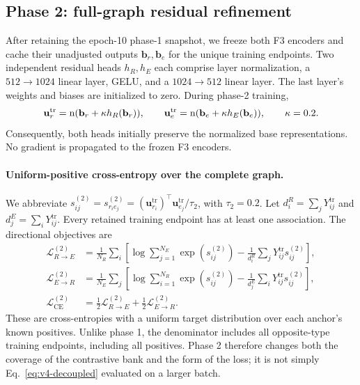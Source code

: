 \subsection{Phase 2: full-graph residual refinement}
\label{sec:v4-phase2}
After retaining the epoch-10 phase-1 snapshot, we freeze both F3 encoders and
cache their unadjusted outputs $\mathbf{b}_r,\mathbf{b}_e$ for the unique training endpoints.
Two independent residual heads $h_R,h_E$ each comprise layer normalization,
a $512\!\to\!1024$ linear layer, GELU, and a $1024\!\to\!512$ linear
layer. The last layer's weights and biases are initialized to zero. During
phase-2 training,
\begin{equation}
  \mathbf{u}_r^{\mathrm{tr}}=\operatorname{n}(\mathbf{b}_r+\kappa h_R(\mathbf{b}_r)),\qquad
  \mathbf{u}_e^{\mathrm{tr}}=\operatorname{n}(\mathbf{b}_e+\kappa h_E(\mathbf{b}_e)),\qquad \kappa=0.2.
  \label{eq:v4-residual-training}
\end{equation}
Consequently, both heads initially preserve the normalized base
representations. No gradient is propagated to the frozen F3 encoders.

\paragraph{Uniform-positive cross-entropy over the complete graph.}
We abbreviate $s_{ij}^{(2)}=s_{r_i e_j}^{(2)}=(\mathbf{u}_{r_i}^{\mathrm{tr}})^\top
\mathbf{u}_{e_j}^{\mathrm{tr}}/\tau_2$, with $\tau_2=0.2$. Let
$d_i^R=\sum_jY^{\mathrm{tr}}_{ij}$ and $d_j^E=\sum_iY^{\mathrm{tr}}_{ij}$. Every retained training
endpoint has at least one association. The directional objectives are
\begin{align}
  \mathcal L_{R\to E}^{(2)}
    &=\frac{1}{N_R}\sum_i\left[
       \log\sum_{j=1}^{N_E}\exp(s_{ij}^{(2)})
       -\frac{1}{d_i^R}\sum_jY^{\mathrm{tr}}_{ij}s_{ij}^{(2)}\right],\\
  \mathcal L_{E\to R}^{(2)}
    &=\frac{1}{N_E}\sum_j\left[
       \log\sum_{i=1}^{N_R}\exp(s_{ij}^{(2)})
       -\frac{1}{d_j^E}\sum_iY^{\mathrm{tr}}_{ij}s_{ij}^{(2)}\right],\\
  \mathcal L_{\mathrm{CE}}^{(2)}
    &=\tfrac12\mathcal L_{R\to E}^{(2)}+
      \tfrac12\mathcal L_{E\to R}^{(2)}.
  \label{eq:v4-fullgraph}
\end{align}
These are cross-entropies with a uniform target distribution over each
anchor's known positives. Unlike phase 1, the denominator includes all
opposite-type training endpoints, including all positives. Phase 2 therefore
changes both the coverage of the contrastive bank and the form of the loss;
it is not simply Eq.~\eqref{eq:v4-decoupled} evaluated on a larger batch.


